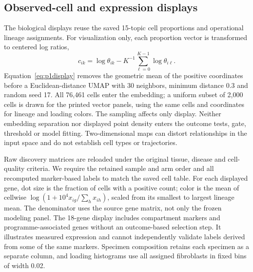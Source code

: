 \subsection{Observed-cell and expression displays}
The biological displays reuse the saved 15-topic cell proportions and operational lineage assignments. For visualization only, each proportion vector is transformed to centered log ratios,
\begin{equation}
c_{ik}=\log\theta_{ik}-K^{-1}\sum_{\ell=0}^{K-1}\log\theta_{i\ell}.\label{eq:p1display}
\end{equation}
Equation~\eqref{eq:p1display} removes the geometric mean of the positive coordinates before a Euclidean-distance UMAP with 30 neighbors, minimum distance 0.3 and random seed 17. All 76,461 cells enter the embedding; a uniform subset of 2,000 cells is drawn for the printed vector panels, using the same cells and coordinates for lineage and loading colors. The sampling affects only display. Neither embedding separation nor displayed point density enters the outcome tests, gate, threshold or model fitting. Two-dimensional maps can distort relationships in the input space and do not establish cell types or trajectories.

Raw discovery matrices are reloaded under the original tissue, disease and cell-quality criteria. We require the retained sample and arm order and all recomputed marker-based labels to match the saved cell table. For each displayed gene, dot size is the fraction of cells with a positive count; color is the mean of cellwise $\log(1+10^4 x_{ig}/\sum_h x_{ih})$, scaled from its smallest to largest lineage mean. The denominator uses the source gene matrix, not only the frozen modeling panel. The 18-gene display includes compartment markers and programme-associated genes without an outcome-based selection step. It illustrates measured expression and cannot independently validate labels derived from some of the same markers. Specimen composition retains each specimen as a separate column, and loading histograms use all assigned fibroblasts in fixed bins of width 0.02.

